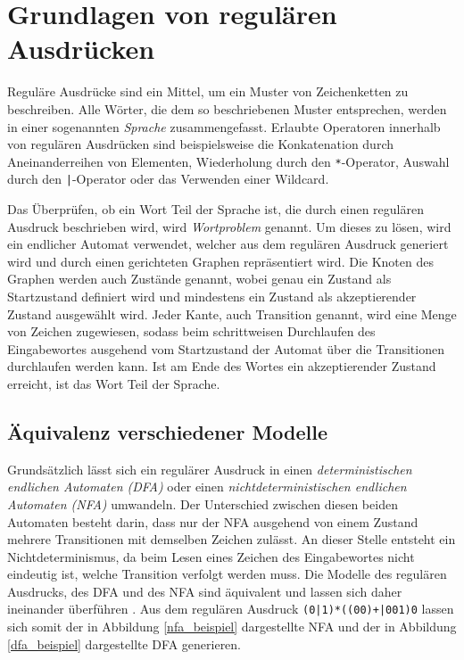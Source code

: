 \chapter{Grundlagen von regulären Ausdrücken}
\label{sec:regex}

Reguläre Ausdrücke sind ein Mittel, um ein Muster von Zeichenketten zu beschreiben.
Alle Wörter, die dem so beschriebenen Muster entsprechen, werden in einer sogenannten \emph{Sprache} zusammengefasst.
Erlaubte Operatoren innerhalb von regulären Ausdrücken sind beispielsweise die Konkatenation durch Aneinanderreihen von Elementen, Wiederholung durch den \texttt{*}-Operator, Auswahl durch den \texttt{|}-Operator oder das Verwenden einer Wildcard.

Das Überprüfen, ob ein Wort Teil der Sprache ist, die durch einen regulären Ausdruck beschrieben wird, wird \emph{Wortproblem} genannt.
Um dieses zu lösen, wird ein endlicher Automat verwendet, welcher aus dem regulären Ausdruck generiert wird und durch einen gerichteten Graphen repräsentiert wird.
Die Knoten des Graphen werden auch Zustände genannt, wobei genau ein Zustand als Startzustand definiert wird und mindestens ein Zustand als akzeptierender Zustand ausgewählt wird.
Jeder Kante, auch Transition genannt, wird eine Menge von Zeichen zugewiesen, sodass beim schrittweisen Durchlaufen des Eingabewortes ausgehend vom Startzustand der Automat über die Transitionen durchlaufen werden kann.
Ist am Ende des Wortes ein akzeptierender Zustand erreicht, ist das Wort Teil der Sprache.

\section{Äquivalenz verschiedener Modelle}

Grundsätzlich lässt sich ein regulärer Ausdruck in einen \emph{deterministischen endlichen Automaten (DFA)} oder einen \emph{nichtdeterministischen endlichen Automaten (NFA)} umwandeln.
Der Unterschied zwischen diesen beiden Automaten besteht darin, dass nur der NFA ausgehend von einem Zustand mehrere Transitionen mit demselben Zeichen zulässt.
An dieser Stelle entsteht ein Nichtdeterminismus, da beim Lesen eines Zeichen des Eingabewortes nicht eindeutig ist, welche Transition verfolgt werden muss.
Die Modelle des regulären Ausdrucks, des DFA und des NFA sind äquivalent und lassen sich daher ineinander überführen \cite{Hopcroft2002}.
Aus dem regulären Ausdruck \texttt{(0|1)*((00)+|001)0} lassen sich somit der in Abbildung \ref{nfa_beispiel} dargestellte NFA und der in Abbildung \ref{dfa_beispiel} dargestellte DFA generieren.

